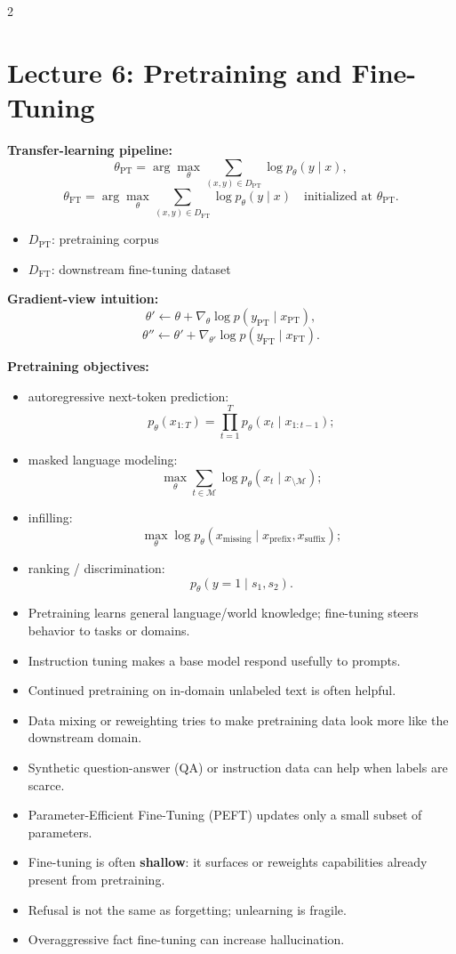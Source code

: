 \documentclass[10pt]{article}
\newenvironment{symdefs}{\begin{itemize}[leftmargin=1.1em, topsep=1pt, itemsep=0pt, parsep=0pt]}{\end{itemize}}
\newcommand{\sym}[2]{\item \textbf{#1}: #2}
\begin{document}
\begin{multicols*}{2}
\section*{Lecture 6: Pretraining and Fine-Tuning}
\textbf{Transfer-learning pipeline:}
\[
\theta_{\mathrm{PT}}
=
\arg\max_\theta \sum_{(x,y)\in D_{\mathrm{PT}}}\log p_\theta(y \mid x),
\]
\[
\theta_{\mathrm{FT}}
=
\arg\max_\theta \sum_{(x,y)\in D_{\mathrm{FT}}}\log p_\theta(y \mid x)
\quad \text{initialized at } \theta_{\mathrm{PT}}.
\]
\begin{symdefs}
\sym{\(D_{\mathrm{PT}}\)}{pretraining corpus}
\sym{\(D_{\mathrm{FT}}\)}{downstream fine-tuning dataset}
\end{symdefs}

\textbf{Gradient-view intuition:}
\[
\theta' \leftarrow \theta + \nabla_\theta \log p(y_{\mathrm{PT}} \mid x_{\mathrm{PT}}),
\]
\[
\theta'' \leftarrow \theta' + \nabla_{\theta'} \log p(y_{\mathrm{FT}} \mid x_{\mathrm{FT}}).
\]

\textbf{Pretraining objectives:}
\begin{itemize}
\item autoregressive next-token prediction:
\[
p_\theta(x_{1:T})
=
\prod_{t=1}^{T} p_\theta(x_t \mid x_{1:t-1});
\]
\item masked language modeling:
\[
\max_\theta \sum_{t \in \mathcal{M}} \log p_\theta(x_t \mid x_{\setminus \mathcal{M}});
\]
\item infilling:
\[
\max_\theta \log p_\theta(x_{\mathrm{missing}} \mid x_{\mathrm{prefix}}, x_{\mathrm{suffix}});
\]
\item ranking / discrimination:
\[
p_\theta(y=1 \mid s_1, s_2).
\]
\end{itemize}

\begin{itemize}
\item Pretraining learns general language/world knowledge; fine-tuning steers behavior to tasks or domains.
\item Instruction tuning makes a base model respond usefully to prompts.
\item Continued pretraining on in-domain unlabeled text is often helpful.
\item Data mixing or reweighting tries to make pretraining data look more like the downstream domain.
\item Synthetic question-answer (QA) or instruction data can help when labels are scarce.
\item Parameter-Efficient Fine-Tuning (PEFT) updates only a small subset of parameters.
\item Fine-tuning is often \textbf{shallow}: it surfaces or reweights capabilities already present from pretraining.
\item Refusal is not the same as forgetting; unlearning is fragile.
\item Overaggressive fact fine-tuning can increase hallucination.
\end{itemize}


\end{multicols*}
\end{document}
